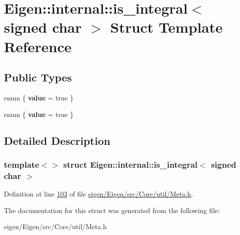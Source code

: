 \hypertarget{struct_eigen_1_1internal_1_1is__integral_3_01signed_01char_01_4}{}\section{Eigen\+:\+:internal\+:\+:is\+\_\+integral$<$ signed char $>$ Struct Template Reference}
\label{struct_eigen_1_1internal_1_1is__integral_3_01signed_01char_01_4}
\subsection*{Public Types}
\begin{DoxyCompactItemize}
\item 
\mbox{\label{struct_eigen_1_1internal_1_1is__integral_3_01signed_01char_01_4_a2f0075b8490f7ef5e12a6dd8a5e7db7f}} 
enum \{ {\bfseries value} = true
 \}
\item 
\mbox{\label{struct_eigen_1_1internal_1_1is__integral_3_01signed_01char_01_4_a01b45efa76b38d7b890b2317457fb30d}} 
enum \{ {\bfseries value} = true
 \}
\end{DoxyCompactItemize}


\subsection{Detailed Description}
\subsubsection*{template$<$$>$\newline
struct Eigen\+::internal\+::is\+\_\+integral$<$ signed char $>$}



Definition at line \hyperlink{eigen_2_eigen_2src_2_core_2util_2_meta_8h_source_l00103}{103} of file \hyperlink{eigen_2_eigen_2src_2_core_2util_2_meta_8h_source}{eigen/\+Eigen/src/\+Core/util/\+Meta.\+h}.



The documentation for this struct was generated from the following file\+:\begin{DoxyCompactItemize}
\item 
eigen/\+Eigen/src/\+Core/util/\+Meta.\+h\end{DoxyCompactItemize}
